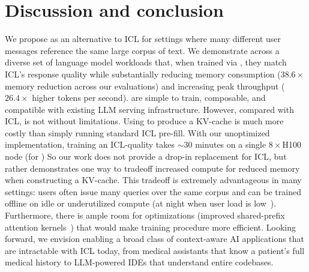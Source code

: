 \section{Discussion and conclusion}
We propose \artifacts as an alternative to ICL for settings where many different user messages reference the same large corpus of text.
We demonstrate across a diverse set of language model workloads that, when trained via \method, they match ICL's response quality while substantially reducing memory consumption  ($38.6\times$ memory reduction across our evaluations) and increasing peak throughput ($26.4\times$ higher tokens per second). \artifacts are simple to train, composable, and compatible with existing LLM serving infrastructure.
However, compared with ICL, \method is not without limitations.
Using \method to produce a KV-cache is much more costly than simply running standard ICL pre-fill.
With our unoptimized implementation, training an ICL-quality \artifact takes $\sim30$ minutes on a single $8\times$H100 node (for \llamaeightb)
So our work does not provide a drop-in replacement for ICL, but rather demonstrates one way to tradeoff increased compute for reduced memory when constructing a KV-cache.
This tradeoff is extremely advantageous in many settings: users often issue many queries over the same corpus and \method can be trained offline on idle or underutilized compute (\eg at night when user load is low~\cite{jaiswal2025serving,goel2025niyama}).
Furthermore, there is ample room for optimizations (\eg improved shared-prefix attention kernels~\cite{dao2022flashattention,ye2025flashinfer, juravsky2024hydragenhighthroughputllminference}) that would make \method training procedure more efficient.
Looking forward, we envision \artifacts enabling a broad class of context-aware AI applications that are intractable with ICL today, from medical assistants that know a patient's full medical history to LLM-powered IDEs that understand entire codebases.



